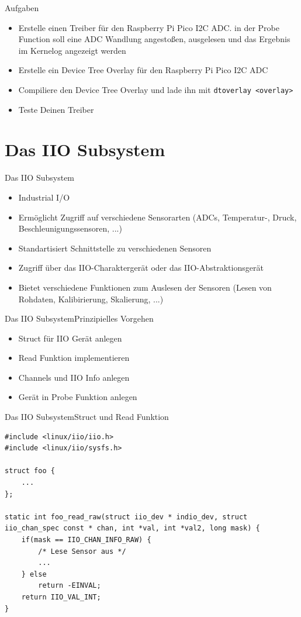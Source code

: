 \documentclass[aspectratio=169]{beamer}
\begin{document}
\begin{frame}{Aufgaben}
	\begin{itemize}
		\item Erstelle einen Treiber für den Raspberry Pi Pico I2C ADC. in der Probe Function soll eine ADC Wandlung angestoßen, ausgelesen und das Ergebnis im Kernelog angezeigt werden 
		\item Erstelle ein Device Tree Overlay für den Raspberry Pi Pico I2C ADC
		\item Compiliere den Device Tree Overlay und lade ihn mit \lstinline|dtoverlay <overlay>|
		\item Teste Deinen Treiber
	\end{itemize}
\end{frame}

\section{Das IIO Subsystem}
\begin{frame}{Das IIO Subsystem}
	\begin{itemize}
		\item Industrial I/O
		\item Ermöglicht Zugriff auf verschiedene Sensorarten (ADCs, Temperatur-, Druck, Beschleunigungssensoren, ...)
		\item Standartisiert Schnittstelle zu verschiedenen Sensoren
		\item Zugriff über das IIO-Charaktergerät oder das IIO-Abstraktionsgerät
		\item Bietet verschiedene Funktionen zum Auslesen der Sensoren (Lesen von Rohdaten, Kalibirierung, Skalierung, ...)
	\end{itemize}
\end{frame}

\begin{frame}{Das IIO Subsystem}{Prinzipielles Vorgehen}
	\begin{itemize}
		\item Struct für IIO Gerät anlegen
		\item Read Funktion implementieren
		\item Channels und IIO Info anlegen
		\item Gerät in Probe Funktion anlegen
	\end{itemize}
\end{frame}

\begin{frame}[fragile]{Das IIO Subsystem}{Struct und Read Funktion}
	\begin{lstlisting}
#include <linux/iio/iio.h>
#include <linux/iio/sysfs.h>

struct foo {
	...
};

static int foo_read_raw(struct iio_dev * indio_dev, struct iio_chan_spec const * chan, int *val, int *val2, long mask) {
	if(mask == IIO_CHAN_INFO_RAW) {
		/* Lese Sensor aus */
		...
	} else
		return -EINVAL;
	return IIO_VAL_INT;
}
	\end{lstlisting}
\end{frame}
\end{document}
